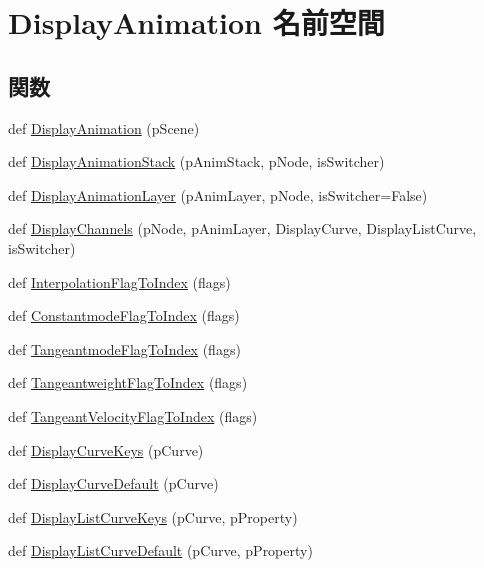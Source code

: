 \hypertarget{namespace_display_animation}{}\section{Display\+Animation 名前空間}
\label{namespace_display_animation}
\subsection*{関数}
\begin{DoxyCompactItemize}
\item 
def \hyperlink{namespace_display_animation_a880f245c5b956a6c385dd32a1fc0847b}{Display\+Animation} (p\+Scene)
\item 
def \hyperlink{namespace_display_animation_a560436e55d1f2d1f4aaff438e885a889}{Display\+Animation\+Stack} (p\+Anim\+Stack, p\+Node, is\+Switcher)
\item 
def \hyperlink{namespace_display_animation_a4fd3c17c01601261c0804e033c5dbc54}{Display\+Animation\+Layer} (p\+Anim\+Layer, p\+Node, is\+Switcher=False)
\item 
def \hyperlink{namespace_display_animation_ac711b47e4bacac4e6ea3a13952d04789}{Display\+Channels} (p\+Node, p\+Anim\+Layer, Display\+Curve, Display\+List\+Curve, is\+Switcher)
\item 
def \hyperlink{namespace_display_animation_a8cf3c4f4a4594a55396f8a40cc46681e}{Interpolation\+Flag\+To\+Index} (flags)
\item 
def \hyperlink{namespace_display_animation_a0d744b3dcd1ff93c1e37672da1967ef7}{Constantmode\+Flag\+To\+Index} (flags)
\item 
def \hyperlink{namespace_display_animation_ad79f710fa5cac2db2b757b88701b45a0}{Tangeantmode\+Flag\+To\+Index} (flags)
\item 
def \hyperlink{namespace_display_animation_ab3506307bd15606f6d6cd8e10079e736}{Tangeantweight\+Flag\+To\+Index} (flags)
\item 
def \hyperlink{namespace_display_animation_af9b64518774d2807bbbf51e84da9dd89}{Tangeant\+Velocity\+Flag\+To\+Index} (flags)
\item 
def \hyperlink{namespace_display_animation_a64c8447ea8c24d78a6f9f1b258a10f83}{Display\+Curve\+Keys} (p\+Curve)
\item 
def \hyperlink{namespace_display_animation_a55353f312afe0c5ef7af7eec3a3ff4f9}{Display\+Curve\+Default} (p\+Curve)
\item 
def \hyperlink{namespace_display_animation_a758aa58fd26fd856b56ca65e1b3ca882}{Display\+List\+Curve\+Keys} (p\+Curve, p\+Property)
\item 
def \hyperlink{namespace_display_animation_a3761e9d949ba1f5c8e06c42df62a5e60}{Display\+List\+Curve\+Default} (p\+Curve, p\+Property)
\end{DoxyCompactItemize}


